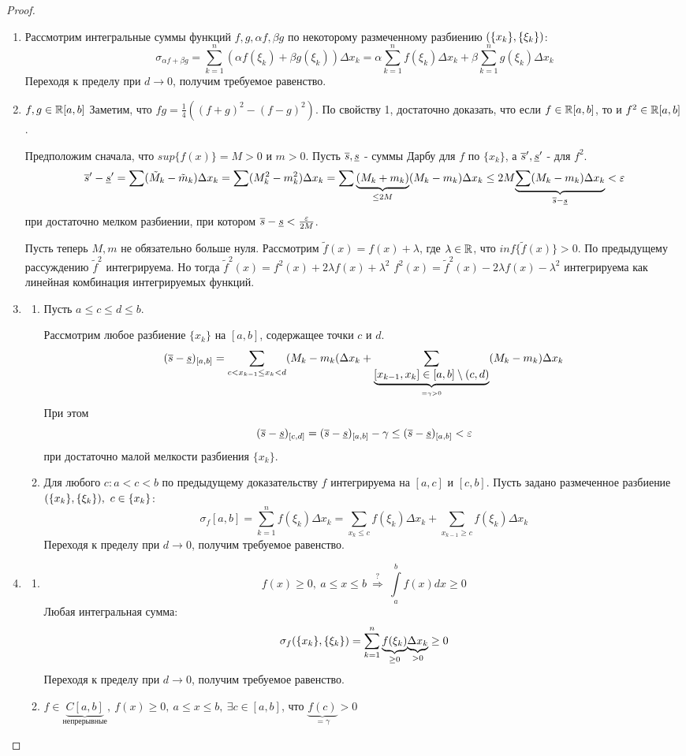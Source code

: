 \begin{proof}$\phantom{Хуй!}$
\begin{enumerate}
\item Рассмотрим интегральные суммы функций $f,g,\alpha f,\beta g$ по некоторому размеченному разбиению $(\{x_k\},\{\xi_k\})$:
$$
\sigma_{\alpha f+\beta g}=\sum\limits^n_{k=1}(\alpha f(\xi_k)+\beta g(\xi_k))\Delta x_k=\alpha\sum\limits^n_{k=1}f(\xi_k)\Delta x_k+\beta\sum\limits^n_{k=1}g(\xi_k)\Delta x_k
$$
Переходя к пределу при $d\to 0$, получим требуемое равенство.
\item $f,g\in\mathbb{R}[a,b]$ Заметим, что $fg=\frac14((f+g)^2-(f-g)^2)$. По свойству 1, достаточно доказать, что если $f\in\mathbb{R}[a,b]$, то и $f^2\in\mathbb{R}[a,b]$.

Предположим сначала, что $sup\{f(x)\}=M>0$ и $m>0$. Пусть $\overline{s},\underline{s}$ - суммы Дарбу для $f$ по $\{x_k\}$, а $\overline{s}',\underline{s}'$ - для $f^2$.
$$
\overline{s}'-\underline{s}'=\sum(\tilde{M}_k-\tilde{m}_k)\Delta x_k=\sum(M^2_k-m^2_k)\Delta x_k=\sum\underset{\leq2M}{\underbrace{(M_k+m_k)}}(M_k-m_k)\Delta x_k\leq2M\underset{\overline{s}-\underline{s}}{\underbrace{\sum(M_k-m_k)\Delta x_k}}<\varepsilon
$$
при достаточно мелком разбиении, при котором $\overline{s}-\underline{s}<\frac{\varepsilon}{2M}$.

Пусть теперь $M,m$ не обязательно больше нуля. Рассмотрим $\tilde{f}(x)=f(x)+\lambda$, где $\lambda\in\mathbb{R}$, что $inf\{\tilde{f}(x)\}>0$. По предыдущему рассуждению $\tilde{f}^2$ интегрируема. Но тогда $\tilde{f}^2(x)=f^2(x)+2\lambda f(x)+\lambda^2$ \then $f^2(x)=\tilde{f}^2(x)-2\lambda f(x)-\lambda^2$ интегрируема как линейная комбинация интегрируемых функций.
\item
\begin{enumerate}
\item Пусть $a\leq c\leq d\leq b$.

Рассмотрим любое разбиение $\{x_k\}$ на $[a,b]$, содержащее точки $c$ и $d$.
$$
(\overline{s}-\underline{s})_{[a,b]}=\sum_{c<x_{k-1}\leq x_k<d}(M_k-m_k(\Delta x_k+\sum_{\underset{=\gamma>0}{\underbrace{[x_{k-1},x_k]\in[a,b]\setminus(c,d)}}}(M_k-m_k)\Delta x_k
$$
При этом
$$
(\overline{s}-\underline{s})_{[c,d]}=(\overline{s}-\underline{s})_{[a,b]}-\gamma\leq(\overline{s}-\underline{s})_{[a,b]}<\varepsilon
$$
при достаточно малой мелкости разбиения $\{x_k\}$.
\item Для любого $c\colon a<c<b$ по предыдущему доказательству $f$ интегрируема на $[a,c]$ и $[c,b]$. Пусть задано размеченное разбиение $\rr,\ c\in\{x_k\}$:
$$
\sigma_{f}[a,b]=\sum^n_{k=1}f(\xi_k)\Delta x_k=\sum_{x_k\leq c}f(\xi_k)\Delta x_k+\sum_{x_{k-1}\geq c}f(\xi_k)\Delta x_k
$$
Переходя к пределу при $d\to0$, получим требуемое равенство.
\end{enumerate}
\item
\begin{enumerate}
\item
$$
f(x)\geq0,\ a\leq x\leq b\ \overset{?}{\Rightarrow}\ \int\limits^b_af(x)dx\geq0
$$
Любая интегральная сумма:
$$
\sigma_f(\{x_k\},\{\xi_k\})=\sum^n_{k=1}\underset{\geq0}{\underbrace{f(\xi_k)}}\underset{>0}{\underbrace{\Delta x_k}}\geq0
$$
Переходя к пределу при $d\to0$, получим требуемое равенство.
\item $f\in \underset{\mbox{непрерывные}}{\underbrace{C[a,b]}},\ f(x)\geq0,\ a\leq x\leq b,\ \exists c\in[a,b]$, что $\underset{=\gamma}{\underbrace{f(c)}}>0$


\end{enumerate}
\end{enumerate}
\end{proof}
